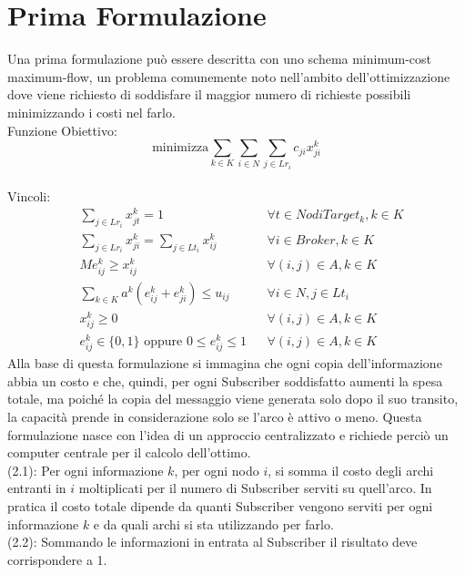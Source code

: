 \documentclass[12pt,a4paper,twoside]{report}
\begin{document}
	\section{Prima Formulazione}
	Una prima formulazione può essere descritta con uno schema minimum-cost maximum-flow, un problema comunemente noto nell'ambito dell'ottimizzazione dove viene richiesto di soddisfare il maggior numero di richieste possibili minimizzando i costi nel farlo. \\
	Funzione Obiettivo:\\
	\begin{equation}
		\text{minimizza} \sum_{k \in K}\sum_{i \in N}\sum_{j \in Lr_i} c_{ji}x^k_{ji}
	\end{equation}
	\smallskip \\
	Vincoli:\\
	\begin{align}
		& \sum_{j \in Lr_i} x^k_{jt} = 1 && \forall t \in NodiTarget_k, k \in K\\[3ex]
		& \sum_{j \in Lr_i}x^k_{ji}=\sum_{j \in Lt_i}x^k_{ij} && \forall i \in Broker, k \in K\\[3ex]
		& Me^k_{ij}\geq x^k_{ij} && \forall(i,j) \in A, k \in K\\[3ex]
		& \sum_{k \in K}a^k(e^k_{ij}+e^k_{ji})\leq u_{ij} && \forall i \in N, j \in Lt_i\\[3ex]
		& x^k_{ij} \geq 0 && \forall (i,j) \in A, k \in K\\[3ex]
		& e^k_{ij} \in \{0,1\} \text{ oppure } 0 \leq e^k_{ij}\leq 1 && \forall (i,j) \in A, k \in K
	\end{align}
	Alla base di questa formulazione si immagina che ogni copia dell'informazione abbia un costo e che, quindi, per ogni Subscriber soddisfatto aumenti la spesa totale, ma poiché la copia del messaggio viene generata solo dopo il suo transito, la capacità prende in considerazione solo se l'arco è attivo o meno. Questa formulazione nasce con l'idea di un approccio centralizzato e richiede perciò  un computer centrale per il calcolo dell'ottimo.\smallskip \\
	(2.1): Per ogni informazione $k$, per ogni nodo $i$, si somma il costo degli archi entranti in $i$ moltiplicati per il numero di Subscriber serviti su quell'arco.
	In pratica il costo totale dipende da quanti Subscriber vengono serviti per ogni informazione $k$ e da quali archi si sta utilizzando per farlo.\smallskip \\
	(2.2): Sommando le informazioni in entrata al Subscriber il risultato deve corrispondere a 1.
\end{document}
